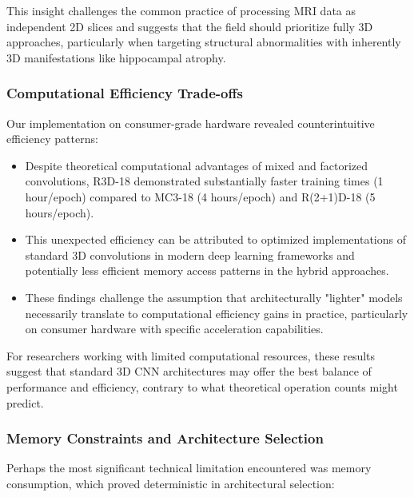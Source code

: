 \documentclass[12pt, a4paper]{article}
\begin{document}
This insight challenges the common practice of processing MRI data as independent 2D slices and suggests that the field should prioritize fully 3D approaches, particularly when targeting structural abnormalities with inherently 3D manifestations like hippocampal atrophy.

\subsubsection{Computational Efficiency Trade-offs}

Our implementation on consumer-grade hardware revealed counterintuitive efficiency patterns:

\begin{itemize}
    \item Despite theoretical computational advantages of mixed and factorized convolutions, R3D-18 demonstrated substantially faster training times (1 hour/epoch) compared to MC3-18 (4 hours/epoch) and R(2+1)D-18 (5 hours/epoch).
    
    \item This unexpected efficiency can be attributed to optimized implementations of standard 3D convolutions in modern deep learning frameworks and potentially less efficient memory access patterns in the hybrid approaches.
    
    \item These findings challenge the assumption that architecturally "lighter" models necessarily translate to computational efficiency gains in practice, particularly on consumer hardware with specific acceleration capabilities.
\end{itemize}

For researchers working with limited computational resources, these results suggest that standard 3D CNN architectures may offer the best balance of performance and efficiency, contrary to what theoretical operation counts might predict.

\subsubsection{Memory Constraints and Architecture Selection}

Perhaps the most significant technical limitation encountered was memory consumption, which proved deterministic in architectural selection:
\end{document}
